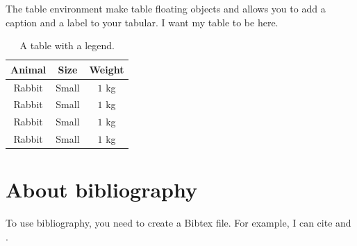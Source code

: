 \documentclass[10pt,a4paper]{article}
\begin{document}
The table environment make table floating objects and allows you to add a caption and a label to your tabular.
\blindtext[3]
I want my table to be here.

\begin{table}[htb] %
\begin{center}
\begin{tabular}{ccc}
\toprule
\textbf{Animal} & \textbf{Size} & \textbf{Weight} \\ 
\midrule
Rabbit & Small & $1$ kg \\ 
Rabbit & Small & $1$ kg \\ 
Rabbit & Small & $1$ kg \\ 
Rabbit & Small & $1$ kg \\ 
\bottomrule
\end{tabular}
\end{center}
\caption{A table with a legend.}
\label{tab:useless_table}
\end{table}


\blindtext[3]

\section{About bibliography}

To use bibliography, you need to create a Bibtex file. 
For example, I can cite \cite{hawking2010nature} and \cite{stromberg2014get}.


\end{document}
